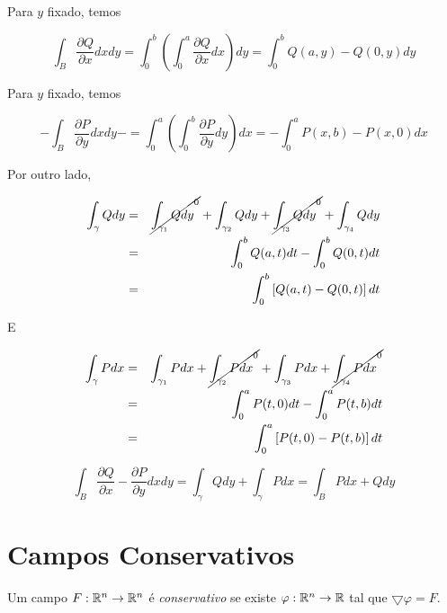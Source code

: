 \documentclass{book}
\begin{document}
\begin{dem}
Para $y$ fixado, temos

\[
\int_B {\frac{{\partial Q}}
{{\partial x}}dxdy}  = \int_0^b {\left( {\int_0^a {\frac{{\partial Q}}
{{\partial x}}dx} } \right)dy}  = \int_0^b {Q(a,y) - Q(0,y)dy} 
\]

Para $y$ fixado, temos

\[
 - \int_B {\frac{{\partial P}}
{{\partial y}}dxdy}  -  = \int_0^a {\left( {\int_0^b {\frac{{\partial P}}
{{\partial y}}dy} } \right)dx}  =  - \int_0^a {P(x,b) - P(x,0)dx} 
\]

Por outro lado,

\begin{eqnarray*}
  \int_\gamma  {Qdy} &=& \cancel{\mathop {\int_{\gamma _1 } {Qdy} }\nolimits^0}  + \int_{\gamma _2 } {Qdy}  + \cancel{\mathop {\int_{\gamma _3 } {Qdy} }\nolimits^0}  + \int_{\gamma _4 } {Qdy}  \hfill \\
   &=& \int_0^b {Q(a,t)dt}  - \int_0^b {Q(0,t)dt}  \hfill \\
   &=& \int_0^b {\left[ {Q(a,t) - Q(0,t)} \right]dt}  \hfill \\ 
\end{eqnarray*}

E

\begin{eqnarray*}
  \int_\gamma  {Pdx} &=& \int_{\gamma _1 } {Pdx} + \cancel{\mathop {\int_{\gamma _2 } {Pdx} }\nolimits^0}  + \int_{\gamma _3 } {Pdx} + \cancel{\mathop {\int_{\gamma _4 } {Pdx} }\nolimits^0}  \hfill \\
   &=& \int_0^a {P(t,0)dt}  - \int_0^a {P(t,b)dt}  \hfill \\
   &=& \int_0^a {\left[ {P(t,0) - P(t,b)} \right]dt}  \hfill \\ 
\end{eqnarray*}

\[
\int_B {\frac{{\partial Q}}
{{\partial x}} - \frac{{\partial P}}
{{\partial y}}dxdy}  = \int_\gamma  {Qdy}  + \int_\gamma  {Pdx}  = \int_B {Pdx + Qdy} 
\]

\end{dem}

\section{Campos Conservativos} \label{sec30}

\begin{defn}
Um campo $F: \mathbb{R}^n \to \mathbb{R}^n$ \'e \emph{conservativo} se existe $\varphi: \mathbb{R}^n \to \mathbb{R}$ tal que $\bigtriangledown \varphi = F$.
\end{defn}
\end{document}
